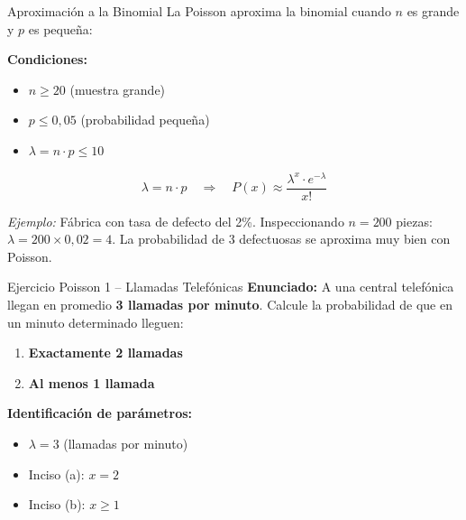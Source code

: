 \documentclass[10pt]{beamer}
\begin{document}
\begin{frame}{Aproximación a la Binomial}
\justifying
La Poisson aproxima la binomial cuando $n$ es grande y $p$ es pequeña:

\vspace{0.3cm}
\textbf{Condiciones:}
\begin{itemize}
    \item $n \geq 20$ (muestra grande)
    \item $p \leq 0,05$ (probabilidad pequeña)
    \item $\lambda = n \cdot p \leq 10$
\end{itemize}

\vspace{0.2cm}
\begin{center}
\Large
\[
\lambda = n \cdot p \quad \Rightarrow \quad P(x) \approx \frac{\lambda^{x} \cdot e^{-\lambda}}{x!}
\]
\end{center}

\vspace{0.2cm}
\justifying
\textit{Ejemplo:} Fábrica con tasa de defecto del 2\%. Inspeccionando $n=200$ piezas: $\lambda = 200 \times 0,02 = 4$. La probabilidad de 3 defectuosas se aproxima muy bien con Poisson.
\end{frame}

\begin{frame}{Ejercicio Poisson 1 -- Llamadas Telefónicas}
\textbf{Enunciado:}
\justifying
A una central telefónica llegan en promedio \textbf{3 llamadas por minuto}. Calcule la probabilidad de que en un minuto determinado lleguen:

\begin{enumerate}
    \item[(a)] \textbf{Exactamente 2 llamadas}
    \item[(b)] \textbf{Al menos 1 llamada}
\end{enumerate}

\vspace{0.2cm}
\textbf{Identificación de parámetros:}
\begin{itemize}
    \item $\lambda = 3$ (llamadas por minuto)
    \item Inciso (a): $x = 2$
    \item Inciso (b): $x \geq 1$
\end{itemize}
\end{frame}
\end{document}
